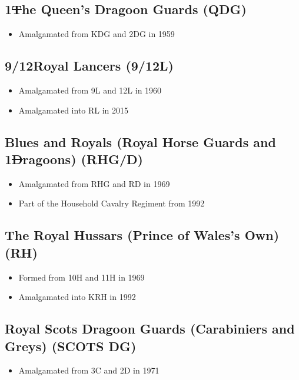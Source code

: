 \subsection*{1\st The Queen's Dragoon Guards (QDG)}

\begin{itemize}
\item Amalgamated from KDG and 2DG in 1959
\end{itemize}

\subsection*{9\nth/12\nth Royal Lancers (9/12L)}

\begin{itemize}
\item Amalgamated from 9L and 12L in 1960
\item Amalgamated into RL in 2015
\end{itemize}

\subsection*{Blues and Royals (Royal Horse Guards and 1\st Dragoons) (RHG/D)}

\begin{itemize}
\item Amalgamated from RHG and RD in 1969
\item Part of the Household Cavalry Regiment from 1992
\end{itemize}

\subsection*{The Royal Hussars (Prince of Wales's Own) (RH)}

\begin{itemize}
\item Formed from 10H and 11H in 1969
\item Amalgamated into KRH in 1992
\end{itemize}

\subsection*{Royal Scots Dragoon Guards (Carabiniers and Greys) (SCOTS DG)}

\begin{itemize}
\item Amalgamated from 3C and 2D in 1971
\end{itemize}

